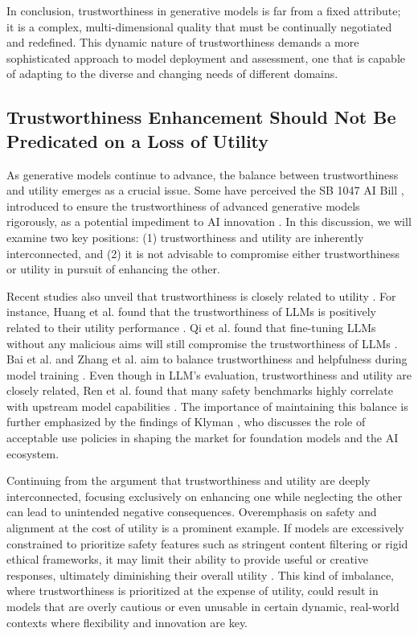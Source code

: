 In conclusion, trustworthiness in generative models is far from a fixed attribute; it is a complex, multi-dimensional quality that must be continually negotiated and redefined. This dynamic nature of trustworthiness demands a more sophisticated approach to model deployment and assessment, one that is capable of adapting to the diverse and changing needs of different domains.


\subsection{Trustworthiness Enhancement Should Not Be Predicated on a Loss of Utility}

As generative models continue to advance, the balance between trustworthiness and utility emerges as a crucial issue. Some have perceived the SB 1047 AI Bill \cite{California2024SB1047}, introduced to ensure the trustworthiness of advanced generative models rigorously, as a potential impediment to AI innovation \cite{calchamber2024godmother}. In this discussion, we will examine two key positions: (1) trustworthiness and utility are inherently interconnected, and (2) it is not advisable to compromise either trustworthiness or utility in pursuit of enhancing the other.

Recent studies also unveil that trustworthiness is closely related to utility \cite{wolf2024tradeoffs, qi2023fine, huang2024position, bai2022training, zhang2024bi}. For instance, Huang et al. found that the trustworthiness of LLMs is positively related to their utility performance \cite{huang2024position}. Qi et al. found that fine-tuning LLMs without any malicious aims will still compromise the trustworthiness of LLMs \cite{qi2023fine}. Bai et al. and Zhang et al. aim to balance trustworthiness and helpfulness during model training \cite{bai2022training, zhang2024bi}. Even though in LLM's evaluation, trustworthiness and utility are closely related, Ren et al. found that many safety benchmarks highly correlate with upstream model capabilities \cite{ren2024safetywashing}. The importance of maintaining this balance is further emphasized by the findings of Klyman \cite{klyman2024acceptable}, who discusses the role of acceptable use policies in shaping the market for foundation models and the AI ecosystem. 

Continuing from the argument that trustworthiness and utility are deeply interconnected, focusing exclusively on enhancing one while neglecting the other can lead to unintended negative consequences. Overemphasis on safety and alignment at the cost of utility is a prominent example. If models are excessively constrained to prioritize safety features such as stringent content filtering or rigid ethical frameworks, it may limit their ability to provide useful or creative responses, ultimately diminishing their overall utility \cite{xstest, kirk2023understanding}. This kind of imbalance, where trustworthiness is prioritized at the expense of utility, could result in models that are overly cautious or even unusable in certain dynamic, real-world contexts where flexibility and innovation are key.

